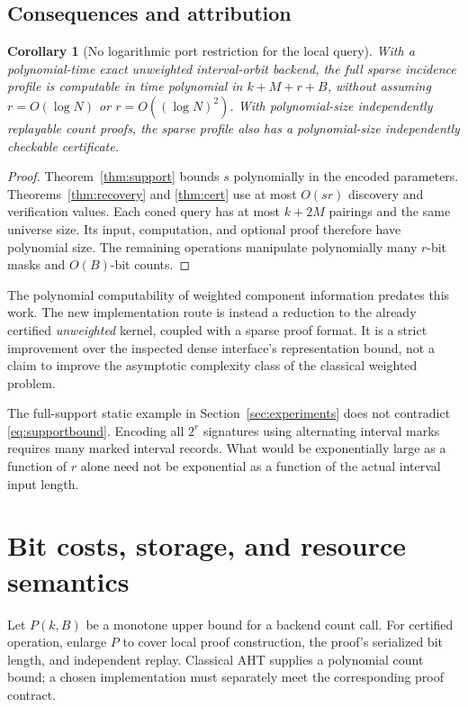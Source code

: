\documentclass[11pt]{article}
\newtheorem{corollary}[theorem]{Corollary}
\theoremstyle{definition}
\begin{document}
\subsection{Consequences and attribution}
\begin{corollary}[No logarithmic port restriction for the local query]
\label{cor:localpoly}
With a polynomial-time exact unweighted interval-orbit backend, the full
sparse incidence profile is computable in time polynomial in
$k+M+r+B$, without assuming $r=O(\log N)$ or
$r=O((\log N)^2)$. With polynomial-size independently replayable count
proofs, the sparse profile also has a polynomial-size independently
checkable certificate.
\end{corollary}
\begin{proof}
Theorem~\ref{thm:support} bounds $s$ polynomially in the encoded parameters.
Theorems~\ref{thm:recovery} and \ref{thm:cert} use at most $O(sr)$ discovery
and verification values. Each coned query has at most $k+2M$ pairings and
the same universe size. Its input, computation, and optional proof therefore
have polynomial size. The remaining operations manipulate polynomially
many $r$-bit masks and $O(B)$-bit counts.
\end{proof}

The polynomial computability of weighted component information predates
this work. The new implementation route is instead a reduction to the
already certified \emph{unweighted} kernel, coupled with a sparse proof
format. It is a strict improvement over the inspected dense interface's
representation bound, not a claim to improve the asymptotic complexity
class of the classical weighted problem.

The full-support static example in Section~\ref{sec:experiments} does not
contradict \eqref{eq:supportbound}. Encoding all $2^r$ signatures using
alternating interval marks requires many marked interval records. What
would be exponentially large as a function of $r$ alone need not be
exponential as a function of the actual interval input length.

\section{Bit costs, storage, and resource semantics}
\label{sec:complexity}
Let $P(k,B)$ be a monotone upper bound for a backend count call. For
certified operation, enlarge $P$ to cover local proof construction, the
proof's serialized bit length, and independent replay. Classical AHT
supplies a polynomial count bound; a chosen implementation must separately
meet the corresponding proof contract.
\end{document}
